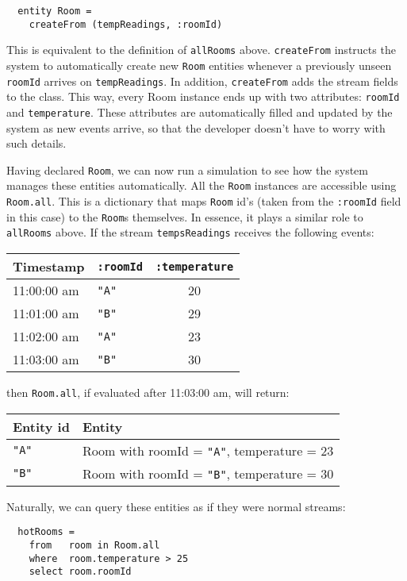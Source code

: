 \documentclass[a4,11pt]{report}
\begin{document}
\begin{lstlisting}
  entity Room =
    createFrom (tempReadings, :roomId)
\end{lstlisting}

This is equivalent to the definition of \verb=allRooms=
above. \verb=createFrom= instructs the system to automatically create
new \verb=Room= entities whenever a previously unseen \verb=roomId=
arrives on \verb=tempReadings=. In addition, \verb=createFrom= adds
the stream fields to the class. This way, every Room instance ends up
with two attributes: \verb=roomId= and \verb=temperature=. These
attributes are automatically filled and updated by the system as new
events arrive, so that the developer doesn't have to worry with such
details.

Having declared \verb=Room=, we can now run a simulation to see how
the system manages these entities automatically. All the \verb=Room=
instances are accessible using \verb=Room.all=. This is a dictionary
that maps \verb=Room= id's (taken from the \verb=:roomId= field in
this case) to the \verb=Room=s themselves. In essence, it plays a similar
role to \verb=allRooms= above. If the stream \verb=tempsReadings=
receives the following events:

\begin{tabular}{ |l|l|c| }
  \hline
  Timestamp & \verb=:roomId= & \verb=:temperature= \\
  \hline
  11:00:00 am & \verb="A"= & 20 \\
  11:01:00 am & \verb="B"= & 29 \\
  11:02:00 am & \verb="A"= & 23 \\
  11:03:00 am & \verb="B"= & 30 \\
  \hline
\end{tabular}

then \verb=Room.all=, if evaluated after 11:03:00 am, will return:

\begin{tabular}{ |l|l| }
  \hline
  Entity id & Entity \\
  \hline
  \verb="A"= & Room with roomId = \verb="A"=, temperature = 23 \\
  \verb="B"= & Room with roomId = \verb="B"=, temperature = 30 \\
  \hline
\end{tabular}

Naturally, we can query these entities as if they were normal streams:

\begin{lstlisting}
  hotRooms =
    from   room in Room.all
    where  room.temperature > 25
    select room.roomId
\end{lstlisting}
\end{document}
